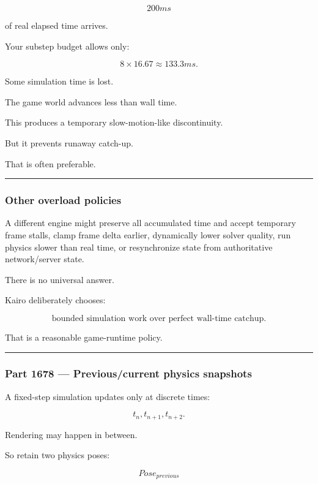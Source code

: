 \[
200ms
\]

of real elapsed time arrives.

Your substep budget allows only:

\[
8\times16.67
\approx133.3ms.
\]

Some simulation time is lost.

The game world advances less than wall time.

This produces a temporary slow-motion-like discontinuity.

But it prevents runaway catch-up.

That is often preferable.

\begin{center}\rule{0.5\linewidth}{0.5pt}\end{center}

\subsubsection{Other overload policies}\label{other-overload-policies}

A different engine might preserve all accumulated time and accept temporary frame stalls, clamp frame delta earlier, dynamically lower solver quality, run physics slower than real time, or resynchronize state from authoritative network/server state.

There is no universal answer.

Kairo deliberately chooses:

\[
\boxed{
\text{bounded simulation work over perfect wall-time catchup}.
}
\]

That is a reasonable game-runtime policy.

\begin{center}\rule{0.5\linewidth}{0.5pt}\end{center}

\subsubsection{Part 1678 --- Previous/current physics snapshots}\label{part-1678-previouscurrent-physics-snapshots}

A fixed-step simulation updates only at discrete times:

\[
t_n,
t_{n+1},
t_{n+2}.
\]

Rendering may happen in between.

So retain two physics poses:

\[
Pose_{previous}
\]

